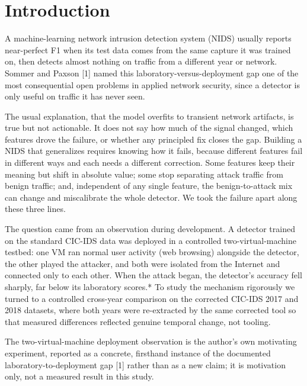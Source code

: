 \documentclass[conference]{IEEEtran}
\begin{document}
\section{Introduction}

A machine-learning network intrusion detection system (NIDS) usually reports near-perfect F1 when its test data comes from the same capture it was trained on, then detects almost nothing on traffic from a different year or network. Sommer and Paxson [1] named this laboratory-versus-deployment gap one of the most consequential open problems in applied network security, since a detector is only useful on traffic it has never seen.
\par\medskip

The usual explanation, that the model overfits to transient network artifacts, is true but not actionable. It does not say how much of the signal changed, which features drove the failure, or whether any principled fix closes the gap. Building a NIDS that generalizes requires knowing how it fails, because different features fail in different ways and each needs a different correction. Some features keep their meaning but shift in absolute value; some stop separating attack traffic from benign traffic; and, independent of any single feature, the benign-to-attack mix can change and miscalibrate the whole detector. We took the failure apart along these three lines.
\par\medskip

The question came from an observation during development. A detector trained on the standard CIC-IDS data was deployed in a controlled two-virtual-machine testbed: one VM ran normal user activity (web browsing) alongside the detector, the other played the attacker, and both were isolated from the Internet and connected only to each other. When the attack began, the detector's accuracy fell sharply, far below its laboratory scores.* To study the mechanism rigorously we turned to a controlled cross-year comparison on the corrected CIC-IDS 2017 and 2018 datasets, where both years were re-extracted by the same corrected tool so that measured differences reflected genuine temporal change, not tooling.
\par\medskip

\footnotesize * The two-virtual-machine deployment observation is the author's own motivating experiment, reported as a concrete, firsthand instance of the documented laboratory-to-deployment gap [1] rather than as a new claim; it is motivation only, not a measured result in this study.\normalsize\par\medskip
\end{document}
